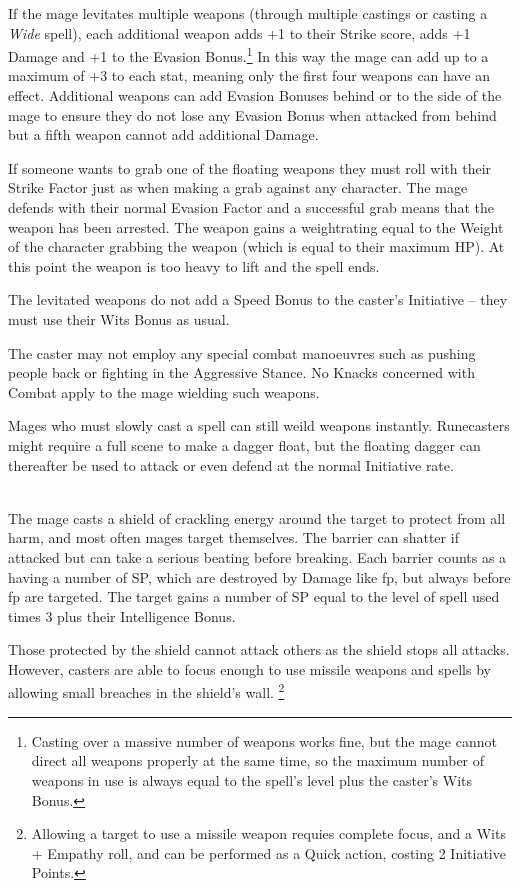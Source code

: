\begin{multicols}{2}
If the mage levitates multiple weapons (through multiple castings or casting a \textit{Wide} spell), each additional weapon adds +1 to their Strike score, adds +1 Damage and +1 to the Evasion Bonus.\footnote{Casting over a massive number of weapons works fine, but the mage cannot direct all weapons properly at the same time, so the maximum number of weapons in use is always equal to the spell's level plus the caster's Wits Bonus.}
In this way the mage can add up to a maximum of +3 to each stat, meaning only the first four weapons can have an effect.
Additional weapons can add Evasion Bonuses behind or to the side of the mage to ensure they do not lose any Evasion Bonus when attacked from behind but a fifth weapon cannot add additional Damage.

If someone wants to grab one of the floating weapons they must roll with their Strike Factor just as when making a grab against any character.
The mage defends with their normal Evasion Factor and a successful grab means that the weapon has been arrested.
The weapon gains a \gls{weightrating} equal to the Weight of the character grabbing the weapon (which is equal to their maximum HP).
At this point the weapon is too heavy to lift and the spell ends.

The levitated weapons do not add a Speed Bonus to the caster's Initiative -- they must use their Wits Bonus as usual.

The caster may not employ any special combat manoeuvres such as pushing people back or fighting in the Aggressive Stance. No Knacks concerned with Combat apply to the mage wielding such weapons.

Mages who must slowly cast a spell can still weild weapons instantly.  Runecasters might require a full scene to make a dagger float, but the floating dagger can thereafter be used to attack or even defend at the normal Initiative rate.

\\
The mage casts a shield of crackling energy around the target to protect from all harm, and most often mages target themselves.  The barrier can shatter if attacked but can take a serious beating before breaking. Each barrier counts as a having a number of \gls{SP}, which are destroyed by Damage like \gls{fp}, but always before \gls{fp} are targeted.
The target gains a number of \gls{SP} equal to the level of spell used times 3 plus their Intelligence Bonus.

Those protected by the shield cannot attack others as the shield stops all attacks.
However, casters are able to focus enough to use missile weapons and spells by allowing small breaches in the shield's wall.
\footnote{Allowing a target to use a missile weapon requies complete focus, and a Wits + Empathy roll, and can be performed as a Quick action, costing 2 Initiative Points.}


\end{multicols}
